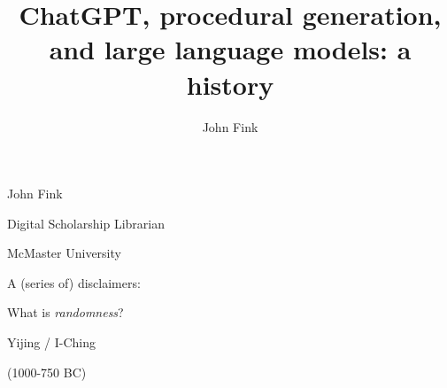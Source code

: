\documentclass{beamer}
\title{ChatGPT, procedural generation, and large language models: a history}
\author{John Fink}
\begin{document}
\begin{frame}
    \maketitle
\end{frame}

\begin{frame}
	John Fink
	
	Digital Scholarship Librarian
	
	McMaster University
\end{frame}

% 




\begin{frame}
	A (series of) disclaimers:
\end{frame}
 

 \begin{frame}[plain]
 \end{frame}

 \begin{frame}
 	What is \textit{randomness}?
 \end{frame}

\begin{frame}[c]
	\centering
	\Huge
	Yijing / I-Ching
	
	(1000-750 BC)
\end{frame}
  
\end{document}
